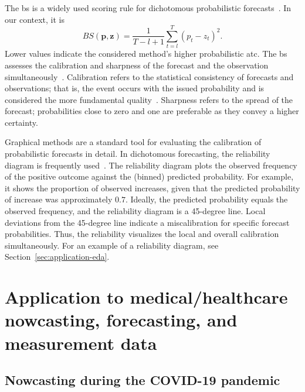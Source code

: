 \documentclass[pdflatex]{sn-jnl}
\theoremstyle{plain}%
\theoremstyle{definition}
\begin{document}
The \ac{bs} is a widely used scoring rule for dichotomous probabilistic forecasts~\citep{Brier1950}.
In our context, it is
\begin{equation*}
    BS (\mathbf{p}, \mathbf{z}) = \frac{1}{T-l+1} \sum_{t=l}^{T} (p_t - z_t)^2.
\end{equation*}
Lower values indicate the considered method's higher probabilistic \ac{atc}.
The \ac{bs} assesses the calibration and sharpness of the forecast and the observation simultaneously~\citep{Ranjan2010, Mitchell2011}.
Calibration refers to the statistical consistency of forecasts and observations; that is, the event occurs with the issued probability and is considered the more fundamental quality~\citep{Gneiting2007}.
Sharpness refers to the spread of the forecast; probabilities close to zero and one are preferable as they convey a higher certainty.

Graphical methods are a standard tool for evaluating the calibration of probabilistic forecasts in detail.
In dichotomous forecasting, the reliability diagram is frequently used~\citep{Ranjan2010}.
The reliability diagram plots the observed frequency of the positive outcome against the (binned) predicted probability.
For example, it shows the proportion of observed increases, given that the predicted probability of increase was approximately $0.7$.
Ideally, the predicted probability equals the observed frequency, and the reliability diagram is a 45-degree line.
Local deviations from the 45-degree line indicate a miscalibration for specific forecast probabilities.
Thus, the reliability visualizes the local and overall calibration simultaneously.
For an example of a reliability diagram, see Section~\ref{sec:application-eda}.


\section{Application to medical/healthcare nowcasting, forecasting, and measurement data} \label{sec:application}

\subsection{Nowcasting during the COVID-19 pandemic} \label{sec:application-covid}
\end{document}

